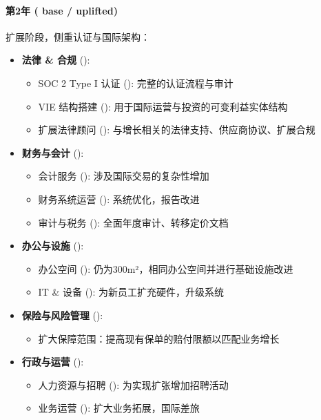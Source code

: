 \documentclass[11pt, a4paper, oneside]{article}
\begin{document}
\paragraph{第2年 ( base /  uplifted)}
扩展阶段，侧重认证与国际架构：

\begin{itemize}
    \item \textbf{法律 \& 合规} ():
    \begin{itemize}
        \item SOC 2 Type I 认证 (): 完整的认证流程与审计
        \item VIE 结构搭建 (): 用于国际运营与投资的可变利益实体结构
        \item 扩展法律顾问 (): 与增长相关的法律支持、供应商协议、扩展合规
    \end{itemize}
    \item \textbf{财务与会计} ():
    \begin{itemize}
        \item 会计服务 (): 涉及国际交易的复杂性增加
        \item 财务系统运营 (): 系统优化，报告改进
        \item 审计与税务 (): 全面年度审计、转移定价文档
    \end{itemize}
    
    \item \textbf{办公与设施} ():
    \begin{itemize}
        \item 办公空间 (): 仍为300m²，相同办公空间并进行基础设施改进
        \item IT \& 设备 (): 为新员工扩充硬件，升级系统
    \end{itemize}
    
    \item \textbf{保险与风险管理} ():
    \begin{itemize}
        \item 扩大保障范围：提高现有保单的赔付限额以匹配业务增长
    \end{itemize}
    
    \item \textbf{行政与运营} ():
    \begin{itemize}
        \item 人力资源与招聘 (): 为实现扩张增加招聘活动
        \item 业务运营 (): 扩大业务拓展，国际差旅
    \end{itemize}
\end{itemize}
\end{document}
